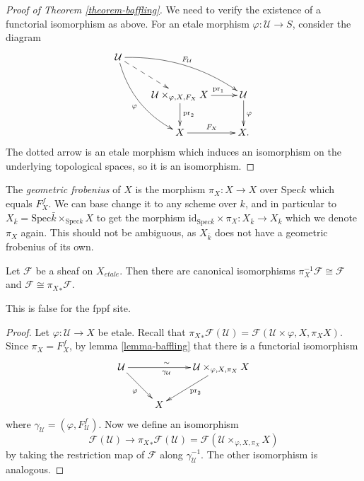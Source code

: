 \begin{proof}[Proof of Theorem \ref{theorem-baffling}]
We need to verify the existence of a functorial isomorphism as above. For an
etale morphism $\varphi: \mathcal{U} \to S$, consider the diagram
$$
\xymatrix{
\mathcal{U} \ar@{-->}[rd] \ar^{F_\mathcal{U}}@/^1pc/[rrd]
\ar_{\varphi}@/_1pc/[rdd] \\
& {\mathcal{U} \times_{\varphi, X,F_X} X} \ar^{\qquad \text{pr}_1 \ \ }[r]
\ar^{\text{pr}_2}[d] & \mathcal{U} \ar^{\varphi}[d] \\
& X \ar^{F_X}[r] & X.
}
$$
The dotted arrow is an etale morphism which induces an isomorphism on the
underlying topological spaces, so it is an isomorphism.
\end{proof}


\begin{definition}
\label{definition-geometric-frobenius}
The {\it geometric frobenius} of $X$ is the morphism $\pi_X : X \to X$ over
$\text{Spec} k$ which equals $F_X^f$. We can base change it to any scheme over
$k$, and in particular to $X_{\bar k} = \text{Spec} \bar k \times_{\text{Spec}
k} X$ to get the morphism $\text{id}_{\text{Spec} \bar k } \times \pi_X :
X_{\bar k} \to X_{\bar k}$ which we denote $\pi_X$ again. This should not be
ambiguous, as $X_{\bar k}$ does not have a geometric frobenius of its own.
\end{definition}

\begin{lemma}
\label{lemma-sheaf-over-finite-field-has-frobenius-descent}
Let $\mathcal{F}$ be a sheaf on $X_{etale}$.
Then there are canonical isomorphisms
$\pi_X^{-1} \mathcal{F} \cong \mathcal{F}$ and
$\mathcal{F} \cong {\pi_X}_*\mathcal{F}$.
\end{lemma}

\noindent
This is false for the fppf site.

\begin{proof}
Let $\varphi: \mathcal{U} \to X$ be etale. Recall that ${\pi_X}_* \mathcal{F}
(\mathcal{U}) = \mathcal{F} (\mathcal{U} \times{\varphi, X, \pi_X} X)$. Since
$\pi_X = F_X^f$, by lemma \ref{lemma-baffling} that there is a
functorial isomorphism
$$
\xymatrix{
\mathcal{U} \ar_{\varphi}[rd] \ar^{\sim \quad}_{\gamma_\mathcal{U} \quad}[rr]
&& {\mathcal{U} \times_{\varphi, X, \pi_X} X} \ar^{\text{pr}_2}[ld]\\
& X
}
$$
where $\gamma_\mathcal{U} = (\varphi, F_\mathcal{U}^f)$. Now we define an
isomorphism
$$
\mathcal{F} (\mathcal{U}) \longrightarrow {\pi_X}_* \mathcal{F} (\mathcal{U}) =
\mathcal{F} (\mathcal{U} \times_{\varphi, X, \pi_X} X)
$$
by taking the restriction map of $\mathcal{F}$ along $\gamma_\mathcal{U}^{-1}$.
The other isomorphism is analogous.
\end{proof}

